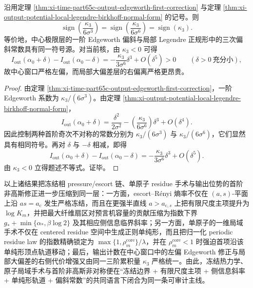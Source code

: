 \begin{corollary}\label{cor:xi-time-part65c-edgeworth-local-ldp-sign-lock}
沿用定理 \ref{thm:xi-time-part65c-output-edgeworth-first-correction} 与定理 \ref{thm:xi-output-potential-local-legendre-birkhoff-normal-form} 的记号。则
\[
\operatorname{sign}\!\left(\frac{\kappa_3}{6\sigma^3}\right)
=
\operatorname{sign}\!\left(\frac{\kappa_3}{6\sigma^6}\right)
=
\operatorname{sign}(\kappa_3).
\]
等价地，中心极限层的一阶 Edgeworth 偏斜与局部 Legendre 正规形中的三次偏斜常数具有同一符号源。对当前核，由 \(\kappa_3<0\) 可得
\[
I_{\mathrm{out}}(\alpha_0+\delta)-I_{\mathrm{out}}(\alpha_0-\delta)
=
-\frac{\kappa_3}{3\sigma^6}\delta^3+O(\delta^5)>0
\qquad (\delta>0\ \text{充分小}),
\]
故中心窗口严格左偏，而局部大偏差层的右偏离严格更昂贵。
\end{corollary}
\begin{proof}
由定理 \ref{thm:xi-time-part65c-output-edgeworth-first-correction}，一阶 Edgeworth 系数为 \(\kappa_3/(6\sigma^3)\)。由定理 \ref{thm:xi-output-potential-local-legendre-birkhoff-normal-form}，
\[
I_{\mathrm{out}}(\alpha_0+\delta)
=
\frac{\delta^2}{2\sigma^2}
-
\left(\frac{\kappa_3}{6\sigma^6}\right)\delta^3
+O(\delta^4).
\]
因此控制两种首阶奇次不对称的常数分别为 \(\kappa_3/(6\sigma^3)\) 与 \(\kappa_3/(6\sigma^6)\)，它们显然具有相同符号。再对 \(\delta\) 与 \(-\delta\) 相减，即得
\[
I_{\mathrm{out}}(\alpha_0+\delta)-I_{\mathrm{out}}(\alpha_0-\delta)
=
-\frac{\kappa_3}{3\sigma^6}\delta^3+O(\delta^5).
\]
由 \(\kappa_3<0\) 立得题述不等式。证毕。
\end{proof}

\noindent
以上诸结果把冻结相 pressure/escort 链、单原子 residue 手术与输出位势的首阶非高斯修正进一步压缩到同一层：一方面，escort--Rényi 熵率不仅在 \((a,s)\)-平面上沿 \(as=a_{\mathrm c}\) 发生严格冻结，而且在更强半直线 \(a>a_{\mathrm c,s}\) 上把有限尺度主项提升为 \(\log K_m\)，并把最大纤维扇区对预言机容量的贡献压缩为指数下界 \(g_*+\min\{\alpha_*,\beta\log 2\}\) 及其相应侧信息临界斜率；另一方面，单原子的一维局域手术不仅在 centered residue 空间中生成正则单纯形，而且把归一化 periodic residue law 的指数精确锁定为 \(\max\{1,\rho_m^{\mathrm{core}}\}/\lambda\)，并在 \(\rho_m^{\mathrm{core}}<1\) 时强迫首项沿该单纯形顶点轨道移动；最后，输出计数在中心窗口中的左偏 Edgeworth 修正与局部大偏差的右侧代价增强又由同一三阶累积量 \(\kappa_3\) 严格统一。由此，冻结热力学、原子局域手术与首阶非高斯非对称便在“冻结边界 + 有限尺度主项 + 侧信息斜率 + 单纯形轨道 + 偏斜常数”的共同语言下闭合为同一条可审计主线。

\endinput
